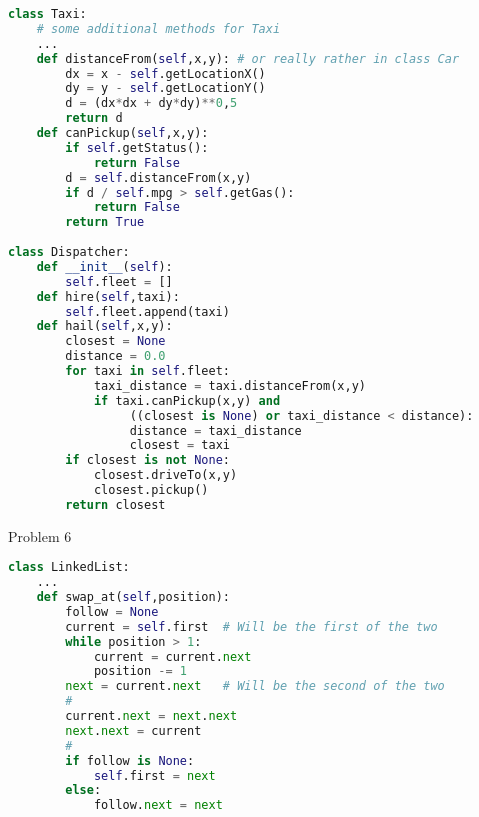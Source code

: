 \documentclass{article}
\begin{document}
\begin{lstlisting}[language=Python]
class Taxi:
    # some additional methods for Taxi
    ...
    def distanceFrom(self,x,y): # or really rather in class Car
        dx = x - self.getLocationX()
        dy = y - self.getLocationY()
        d = (dx*dx + dy*dy)**0,5
        return d
    def canPickup(self,x,y):
        if self.getStatus():
            return False
        d = self.distanceFrom(x,y)
        if d / self.mpg > self.getGas():
            return False
        return True
    
class Dispatcher:
    def __init__(self):
        self.fleet = []
    def hire(self,taxi):
        self.fleet.append(taxi)
    def hail(self,x,y):
        closest = None
        distance = 0.0
        for taxi in self.fleet:
            taxi_distance = taxi.distanceFrom(x,y)
            if taxi.canPickup(x,y) and
                 ((closest is None) or taxi_distance < distance):
                 distance = taxi_distance
                 closest = taxi
        if closest is not None:
            closest.driveTo(x,y)
            closest.pickup()
        return closest
\end{lstlisting}

\newpage
Problem 6

\begin{lstlisting}[language=Python]
class LinkedList:
    ...
    def swap_at(self,position):
        follow = None
        current = self.first  # Will be the first of the two
        while position > 1:
            current = current.next
            position -= 1
        next = current.next   # Will be the second of the two
        #
        current.next = next.next
        next.next = current
        #
        if follow is None:
            self.first = next
        else:
            follow.next = next
\end{lstlisting}
\end{document}
